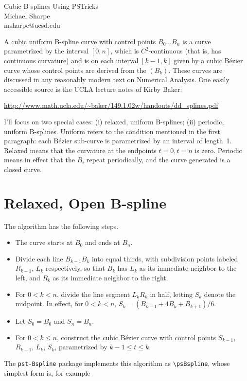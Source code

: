 \documentclass[dvips,11pt]{article}
\begin{document}
\begin{center}{\Large Cubic B-splines Using PSTricks\\[12pt]
\large Michael Sharpe\\[10pt]
msharpe@ucsd.edu}
\end{center}
A cubic uniform B-spline curve with control points $B_0 \ldots B_n$ is a curve parametrized by the interval $[0,n]$, which is $C^2$-continuous (that is, has continuous curvature) and is on each interval $[k-1,k]$ given by a cubic B\'ezier curve whose control points are derived from the $(B_k)$. These curves are discussed in any reasonably modern text on Numerical Analysis. One easily accessible source is the UCLA lecture notes of Kirby Baker:

\noindent\url{http://www.math.ucla.edu/~baker/149.1.02w/handouts/dd_splines.pdf}

I'll focus on two special cases: (i) relaxed, uniform B-splines; (ii) periodic, uniform B-splines. Uniform refers to the condition mentioned in the first paragraph: each B\'ezier sub-curve is parametrized by an interval of  length~1. Relaxed means that the curvature at the endpoints $t=0, t=n$ is zero. Periodic means in effect that the $B_i$ repeat periodically, and the curve generated is a closed curve. 

\section{Relaxed, Open B-spline} The algorithm has the following steps.

\begin{itemize}
\item The curve starts at $B_0$ and ends at $B_n$.
\item Divide each line $B_{k-1}B_k$ into equal thirds, with subdivision points labeled $R_{k-1}$, $L_k$ respectively, so that $B_k$ has $L_k$ as its immediate neighbor to the left, and $R_k$ as its immediate neighbor to the right.
\item For $0<k<n$, divide the line segment $L_kR_k$ in half, letting $S_k$ denote the midpoint. In effect, for $0< k<n$, $S_k=(B_{k-1}+4B_k+B_{k+1})/6$.
\item Let $S_0=B_0$ and $S_n=B_n$.
\item For $0<k\le n$, construct the cubic B\'ezier curve with control points $S_{k-1}$, $R_{k-1}$, $L_k$, $S_k$, parametrized by $k-1\le t\le k$.
\end{itemize}

The {\tt pst-Bspline} package implements this algorithm as \verb|\psBspline|, whose simplest form is, for example
\end{document}
